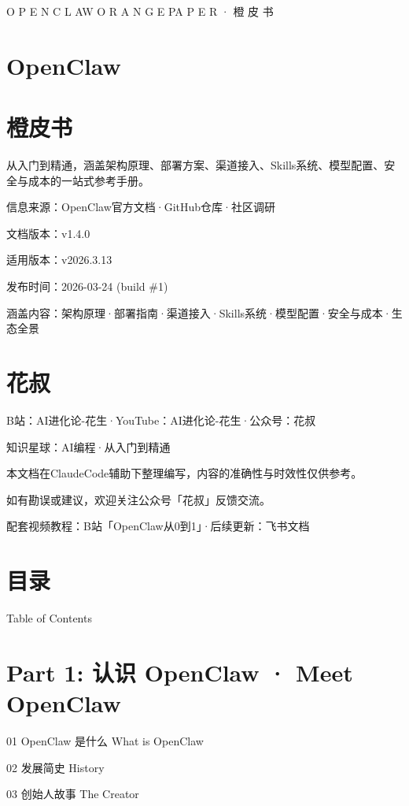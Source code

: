 \documentclass[
  10
]{article}
\author{}
\date{}
\begin{document}
O P E N C L AW O R A N G E PA P E R · 橙 ⽪ 书

\section{OpenClaw}\label{openclaw}

\section{橙皮书}\label{ux6a59ux76aeux4e66}

从入门到精通，涵盖架构原理、部署方案、渠道接入、Skills系统、模型配置、安全与成本的一站式参考手册。

信息来源：OpenClaw官方文档·GitHub仓库·社区调研

文档版本：v1.4.0

适用版本：v2026.3.13

发布时间：2026-03-24 (build \#1)

涵盖内容：架构原理·部署指南·渠道接入·Skills系统·模型配置·安全与成本·生态全景

\section{花叔}\label{ux82b1ux53d4}

B站：AI进化论-花生·YouTube：AI进化论-花生·公众号：花叔

知识星球：AI编程·从入门到精通

本文档在ClaudeCode辅助下整理编写，内容的准确性与时效性仅供参考。

如有勘误或建议，欢迎关注公众号「花叔」反馈交流。

配套视频教程：B站「OpenClaw从0到1」·后续更新：飞书文档

\section{目录}\label{ux76eeux5f55}

Table of Contents

\section{Part 1: 认识 OpenClaw · Meet
OpenClaw}\label{part-1-ux8ba4ux8bc6-openclaw-meet-openclaw}

01 OpenClaw 是什么 What is OpenClaw

02 发展简史 History

03 创始人故事 The Creator
\end{document}
